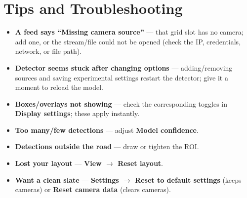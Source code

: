 \documentclass[11pt]{article}
\newcommand{\ui}[1]{\textbf{#1}}
\begin{document}
\section{Tips and Troubleshooting}
\begin{itemize}[nosep]
  \item \textbf{A feed says ``Missing camera source''} --- that grid slot has no
        camera; add one, or the stream/file could not be opened (check the IP,
        credentials, network, or file path).
  \item \textbf{Detector seems stuck after changing options} --- adding/removing
        sources and saving experimental settings restart the detector; give it a
        moment to reload the model.
  \item \textbf{Boxes/overlays not showing} --- check the corresponding toggles
        in \ui{Display settings}; these apply instantly.
  \item \textbf{Too many/few detections} --- adjust \ui{Model confidence}.
  \item \textbf{Detections outside the road} --- draw or tighten the ROI.
  \item \textbf{Lost your layout} --- \ui{View $\rightarrow$ Reset layout}.
  \item \textbf{Want a clean slate} --- \ui{Settings $\rightarrow$ Reset to
        default settings} (keeps cameras) or \ui{Reset camera data} (clears
        cameras).
\end{itemize}
\end{document}
